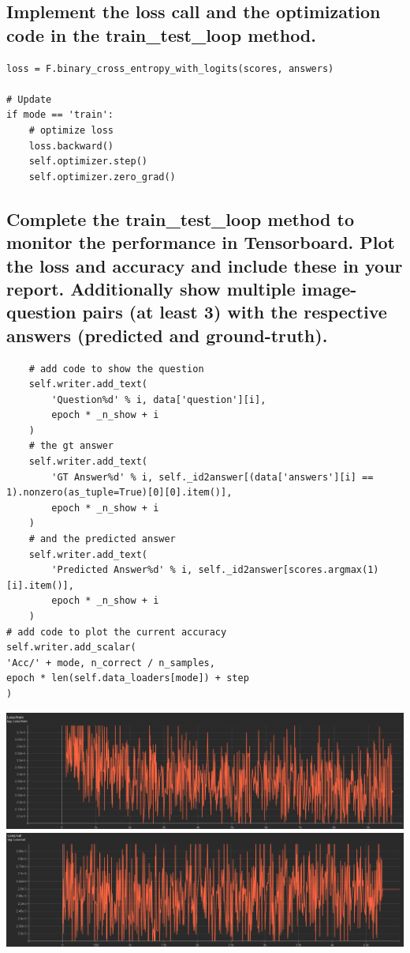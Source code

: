 \documentclass{article}
\begin{document}
\subsection{Implement the loss call and the optimization code in the train\_test\_loop method.}
\begin{lstlisting}
loss = F.binary_cross_entropy_with_logits(scores, answers)

# Update
if mode == 'train':
    # optimize loss
    loss.backward()
    self.optimizer.step()
    self.optimizer.zero_grad()
\end{lstlisting}

\subsection{Complete the train\_test\_loop method to monitor the performance in Tensorboard. Plot the loss and accuracy and include these in your report. Additionally show multiple image-question pairs (at least 3) with the respective answers (predicted and ground-truth).}
\begin{lstlisting}
    # add code to show the question
    self.writer.add_text(
        'Question%d' % i, data['question'][i],
        epoch * _n_show + i
    )
    # the gt answer
    self.writer.add_text(
        'GT Answer%d' % i, self._id2answer[(data['answers'][i] == 1).nonzero(as_tuple=True)[0][0].item()],
        epoch * _n_show + i
    )
    # and the predicted answer
    self.writer.add_text(
        'Predicted Answer%d' % i, self._id2answer[scores.argmax(1)[i].item()],
        epoch * _n_show + i
    )
# add code to plot the current accuracy
self.writer.add_scalar(
'Acc/' + mode, n_correct / n_samples,
epoch * len(self.data_loaders[mode]) + step
)
\end{lstlisting}
\includegraphics[width=\textwidth]{q2.6_1.png}
\includegraphics[width=\textwidth]{q2.6_2.png}
\end{document}
